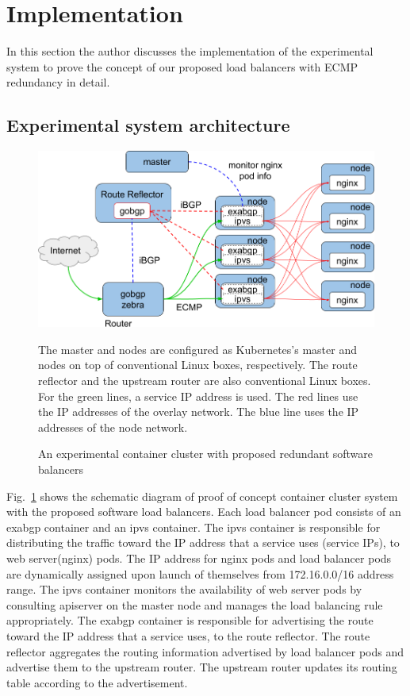 \section{Implementation}

In this section the author discusses the implementation of the experimental system to prove the concept of our proposed load balancers with ECMP redundancy in detail.

\subsection{Experimental system architecture}\label{sec:poc}

\begin{figure}[tb]
\begin{center}
\includegraphics[width=0.8\columnwidth]{Figs/poc.png}
\end{center}
\caption{An experimental container cluster with proposed redundant software balancers}
\centering\parbox[c]{0.9\columnwidth}{
  The master and nodes are configured as Kubernetes's master and nodes on top of conventional Linux boxes, respectively.
  The route reflector and the upstream router are also conventional Linux boxes.
  For the green lines, a service IP address is used. The red lines use the IP addresses of the overlay network. The blue line uses the IP addresses of the node network.
}

\label{fig:poc}
\end{figure}

Fig.~\ref{fig:poc} shows the schematic diagram of proof of concept container cluster system with the proposed software load balancers.
%
Each load balancer pod consists of an exabgp container and an ipvs container.
The ipvs container is responsible for distributing the traffic toward the IP address that a service uses (service IPs), to web server(nginx) pods.
The IP address for nginx pods and load balancer pods are dynamically assigned upon launch of themselves from 172.16.0.0/16 address range.
The ipvs container monitors the availability of web server pods by consulting apiserver on the master node and manages the load balancing rule appropriately.
The exabgp container is responsible for advertising the route toward the IP address that a service uses, to the route reflector.
The route reflector aggregates the routing information advertised by load balancer pods and advertise them to the upstream router.
The upstream router updates its routing table according to the advertisement.

